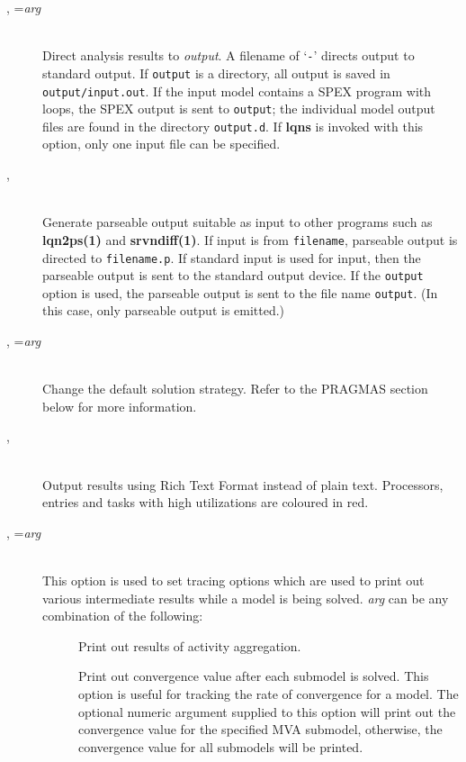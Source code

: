 \begin{description}
\item[, =\emph{arg}]~\\
Direct analysis results to \emph{output}.  A filename of `\texttt{-}'
directs output to standard output.  If \texttt{output} is a directory, all output is saved in \texttt{output/input.out}. If the input model contains a SPEX program with loops, the SPEX output is sent to \texttt{output}; the individual model output files are found in the directory \texttt{output.d}. If \textbf{lqns} is invoked with this
option, only one input file can be specified.
\item[, ]~\\
Generate parseable output suitable as input to other programs such as
\textbf{lqn2ps(1)} and \textbf{srvndiff(1)}.  If input is from
\texttt{filename}, parseable output is directed to \texttt{filename.p}.
If standard input is used for input, then the parseable output is sent
to the standard output device.  If the \texttt{output} option is used, the
parseable output is sent to the file name \texttt{output}.
(In this case, only parseable output is emitted.)
\item[, =\emph{arg}]~\\
Change the default solution strategy.  Refer to the PRAGMAS section
below for more information.
\item[, ]~\\
Output results using Rich Text Format instead of plain text.  Processors, entries and tasks with high utilizations are coloured in red.
\item[, =\emph{arg}]~\\
This option is used to set tracing  options which are used to print out various
intermediate results  while a model is being solved.
\emph{arg} can be any combination of the following:
\begin{description}
\item[]
Print out results of activity aggregation.
\item[]
Print out convergence value after each submodel is solved.
This option is useful for tracking the rate of convergence for a model.
The optional numeric argument supplied to this option will print out the convergence value for the specified MVA submodel, otherwise,
the convergence value for all submodels will be printed.

\end{description}
\end{description}
